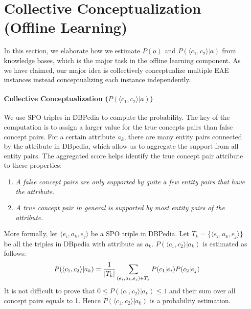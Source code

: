 \section{Collective Conceptualization (Offline Learning)}
In this section, we elaborate how we estimate $P(a)$ and $P( \langle c_{1},c_{2} \rangle |a)$ from knowledge bases, which is the major task in the offline learning component. As we have claimed, our major idea is collectively conceptualize multiple EAE instances instead conceptualizing each instance independently.

\vspace{-2mm}
\paragraph{Collective Conceptualization ($P( \langle c_{1},c_{2} \rangle |a)$) }
We use SPO triples in DBPedia to compute the probability.
The key of the computation is to assign a larger value for the true concepts pairs than false concept pairs.
For a certain attribute $a_k$, there are many entity pairs connected by the attribute in DBpedia, which allow us to aggregate the support from all entity pairs.
The aggregated score helps identify the true concept pair attribute to these properties:
\begin{enumerate}
\small
\item \emph{A false concept pairs are only supported by quite a few
entity pairs that have the attribute.}
\item \emph{A true concept pair in general is supported by most entity pairs of the attribute.}
\end{enumerate}

More formally, let $ \langle e_i, a_k, e_j \rangle $ be a SPO triple in DBPedia.
Let $T_k=\{\langle e_i, a_k, e_j \rangle\}$ be all the triples in DBpedia with attribute as $a_k$.
$P( \langle c_1, c_2 \rangle |a_k)$ is estimated as follows:
\begin{equation}
\small
P(\langle c_1, c_2\rangle|a_k)= \frac{1}{|T_k|}\sum_{  (e_{i},a_k,e_{j})\in T_k } P(c_1|e_{i})P(c_2|e_{j})
\label{eq:pccga}
\end{equation}
It is not difficult to prove that $0\leq P( \langle c_1, c_2 \rangle |a_k)\leq 1$ and their sum over all concept pairs equals to 1.
Hence $P( \langle c_1, c_2 \rangle |a_k)$ is a probability estimation.


